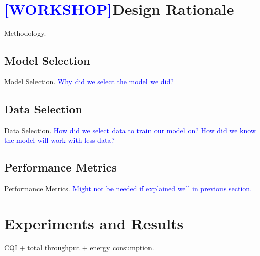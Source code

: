 \documentclass[conference]{IEEEtran}
\begin{document}
\begin{comment}
\begin{algorithm}
\caption{Cell Bringup Procedure}
\SetAlgoLined
\KwData{For each cell we have desired pattern for CQI distribution for each traffic pattern and time of day}
\For{each cell}{
    Measure the distance between CQI distributions observed and desired\;
    \If{the observed is off by a certain threshold}{
        Turn the cell ON\;
        Recalculate the predicted CQI distribution\;
        \If{the distribution improves}{
            Keep the cell ON\;
        }
        \Else{
            Leave the cell OFF\;
        }
    }
}
\end{algorithm}

\begin{algorithm}
    \SetKwInOut{Input}{Input}
    \SetKwInOut{Output}{Output}

    \underline{function CellBringup} $()$\;
    \Input{Two nonnegative integers $a$ and $b$}
    \Output{$\gcd(a,b)$}
    \eIf{$b=0$}
      {
        return $a$\;
      }
      {
        return Euclid$(b,a\mod b)$\;
      }
    \caption{Algorithm}
\end{algorithm}
\end{comment}

\section{\textcolor{blue}{[WORKSHOP]}Design Rationale}
Methodology.

\subsection{Model Selection}
Model Selection. \textcolor{blue}{Why did we select the model we did?}

\subsection{Data Selection}
Data Selection. \textcolor{blue}{How did we select data to train our model on? How did we know the model will work with less data?}

\subsection{Performance Metrics}
Performance Metrics. \textcolor{blue}{Might not be needed if explained well in previous section.}

\section{Experiments and Results}
CQI + total throughput + energy consumption. \\
\end{document}
